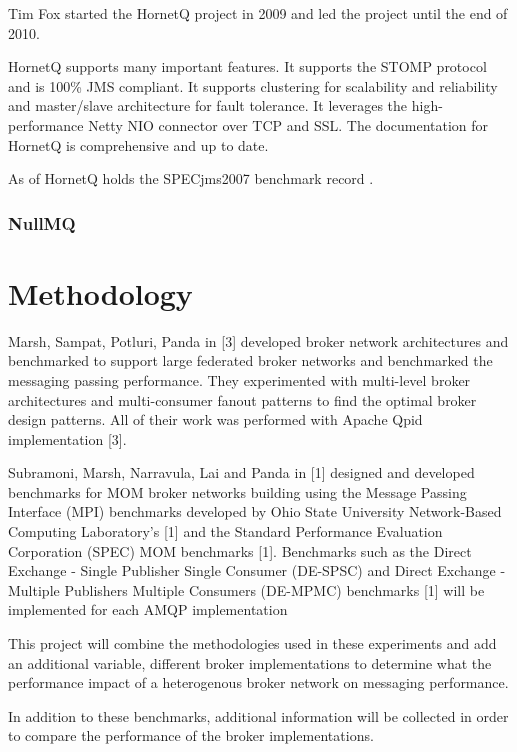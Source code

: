 \documentclass{thesis}
\begin{document}
Tim Fox started the HornetQ project in 2009 and led the project until the end of 2010. 

HornetQ supports many important features.  It supports the STOMP  protocol and is 100\% JMS compliant.  It supports clustering for scalability and reliability and master/slave architecture for fault tolerance.  It leverages the high-performance Netty NIO connector over TCP and SSL.  The documentation for HornetQ is comprehensive and up to date.  

As of  HornetQ holds the SPECjms2007 benchmark record .  



\subsection{NullMQ}

\chapter{Methodology}
Marsh, Sampat, Potluri, Panda in [3] developed broker network architectures and benchmarked to support large federated broker networks and benchmarked the messaging passing performance.  They experimented with multi-level broker architectures and multi-consumer fanout patterns to find the optimal broker design patterns.  All of their work was performed with Apache Qpid implementation [3].  

Subramoni, Marsh, Narravula, Lai and Panda in [1] designed and developed benchmarks for MOM broker networks building using the Message Passing Interface (MPI) benchmarks developed by Ohio State University Network-Based Computing Laboratory’s [1] and the Standard Performance Evaluation Corporation (SPEC) MOM benchmarks  [1].  Benchmarks such as the Direct Exchange - Single Publisher Single Consumer (DE-SPSC) and Direct Exchange - Multiple Publishers Multiple Consumers (DE-MPMC) benchmarks [1] will be implemented for each AMQP implementation 

This project will combine the methodologies used in these experiments and add an additional variable, different broker implementations to determine what the performance impact of a heterogenous broker network on messaging performance.

In addition to these benchmarks, additional information will be collected in order to compare the performance of the broker implementations.
\end{document}
